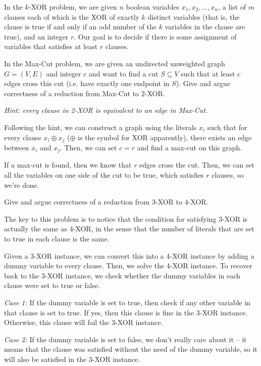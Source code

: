 \documentclass[11pt]{article}
\begin{document}
\newpage


In the $k$-XOR problem, we are given $n$ boolean variables $x_1, x_2, \ldots, x_n$, a list of $m$ clauses each of which is the XOR of exactly $k$ distinct variables (that is, the clause is true if and only if an odd number of the $k$ variables in the clause are true), and an integer $r$. Our goal is to decide if there is some assignment of variables that satisfies at least $r$ clauses.

\begin{subparts}
\subpart In the Max-Cut problem, we are given an undirected unweighted graph $G=(V, E)$ and integer $c$ and want to find a cut $S \subseteq V$ such that at least $c$ edges cross this cut (i.e. have exactly one endpoint in $S$). Give and argue correctness of a reduction from Max-Cut to $2$-XOR.

\textit{Hint: every clause in 2-XOR is equivalent to an edge in Max-Cut.}

\begin{solution}
	Following the hint, we can construct a graph using the literals \( x_i \) such that for every clause 
	\( x_i \oplus x_j \) (\( \oplus \) is the symbol for XOR apparently), there exists an edge between 
	\( x_i \) and \( x_j \). Then, we can set \( c = r \) 
	and find a max-cut on this graph. 

	If a max-cut is found, then we know that \( r \) edges cross the cut. Then, we can set all the variables 
	on one side of the cut to be true, which satisfies \( r \) clauses, so we're done. 
\end{solution}

\subpart Give and argue correctness of a reduction from $3$-XOR to $4$-XOR.

\begin{solution}
	The key to this problem is to notice that the condition for satisfying 3-XOR is actually the same as 
	4-XOR, in the sense that the number of literals that are set to true in each clause is the same.

	Given a 3-XOR instance, we can convert this into a 4-XOR instance by adding a dummy variable to every clause. 
	Then, we solve the 4-XOR instance. To recover back to the 3-XOR instance, we check whether the dummy 
	variables in each clause were set to true or false. 

	\textit{Case 1:} If the dummy variable is set to true, then check if any other variable in that clause 
	is set to true. If yes, then this clause is fine in the 3-XOR instance. Otherwise, this clause will fail 
	the 3-XOR instance. 

	\textit{Case 2:} If the dummy variable is set to false, we don't really care about it -- it means that 
	the clause was satisfied without the need of the dummy variable, so it will also be satisfied in the 3-XOR
	instance. 
\end{solution}
\end{subparts}
\end{document}
